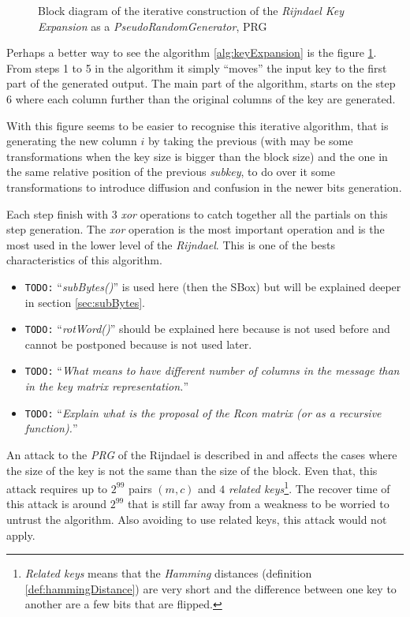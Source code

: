 \documentclass[10pt,a4paper,twoside]{llncs}
\newcommand{\todo}[1]{\texttt{\color{red}TODO:} ``\emph{#1}''}
\begin{document}
\begin{figure}[h!]
\begin{center}
\begin{tikzpicture}[>=latex]
\end{tikzpicture}
\caption{Block diagram of the iterative construction of the \emph{Rijndael Key Expansion} as a \emph{PseudoRandomGenerator}, PRG}
\label{fig:keyExpansionDiagram}
\end{center}
\end{figure}

Perhaps a better way to see the algorithm \ref{alg:keyExpansion} is the figure \ref{fig:keyExpansionDiagram}. From steps 1 to 5 in the algorithm it simply ``moves'' the input key to the first part of the generated output. The main part of the algorithm, starts on the step 6 where each column further than the original columns of the key are generated.

With this figure seems to be easier to recognise this iterative algorithm, that is generating the new column $i$ by taking the previous (with may be some transformations when the key size is bigger than the block size) and the one in the same relative position of the previous \emph{subkey}, to do over it some transformations to introduce diffusion and confusion in the newer bits generation.

Each step finish with 3 \emph{xor} operations to catch together all the partials on this step generation. The \emph{xor} operation is the most important operation and is the most used in the lower level of the \emph{Rijndael}. This is one of the bests characteristics of this algorithm.

\begin{itemize}
 \item \todo{subBytes()} is used here (then the SBox) but will be explained deeper in section \ref{sec:subBytes}.
 \item \todo{rotWord()} should be explained here because is not used before and cannot be postponed because is not used later.
 \item \todo{What means to have different number of columns in the message than in the key matrix representation.}
 \item \todo{Explain what is the proposal of the Rcon matrix (or as a recursive function).}
\end{itemize}

An attack to the \emph{PRG} of the Rijndael is described in \cite{fullaes-192-256} and affects the cases where the size of the key is not the same than the size of the block. Even that, this attack requires up to $2^{99}$ pairs $(m,c)$ and $4$ \emph{related keys}\footnote{\emph{Related keys} means that the \emph{Hamming} distances (definition \ref{def:hammingDistance}) are very short and the difference between one key to another are a few bits that are flipped.}. The recover time of this attack is around $2^{99}$ that is still far away from a weakness to be worried to untrust the algorithm. Also avoiding to use related keys, this attack would not apply.
\end{document}
